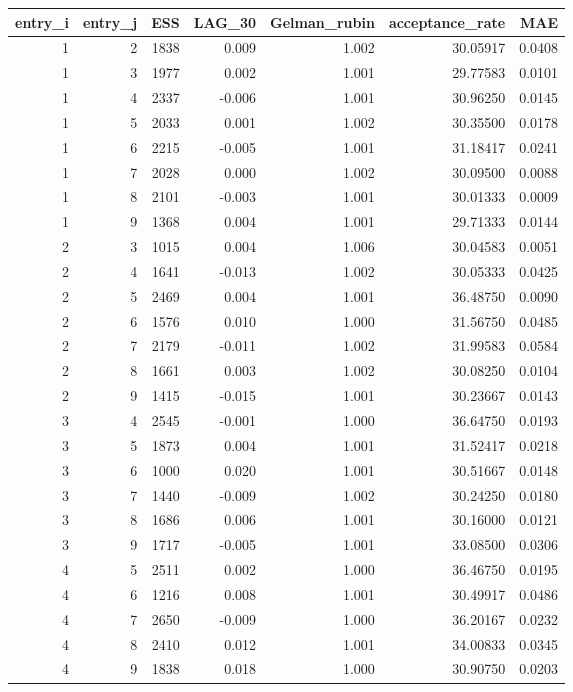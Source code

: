 \begin{longtable}{rrrrrrr}
\toprule
entry\_i & entry\_j & ESS & LAG\_30 & Gelman\_rubin & acceptance\_rate & MAE \\ 
\midrule
1 & 2 & 1838 & 0.009 & 1.002 & 30.05917 & 0.0408 \\ 
1 & 3 & 1977 & 0.002 & 1.001 & 29.77583 & 0.0101 \\ 
1 & 4 & 2337 & -0.006 & 1.001 & 30.96250 & 0.0145 \\ 
1 & 5 & 2033 & 0.001 & 1.002 & 30.35500 & 0.0178 \\ 
1 & 6 & 2215 & -0.005 & 1.001 & 31.18417 & 0.0241 \\ 
1 & 7 & 2028 & 0.000 & 1.002 & 30.09500 & 0.0088 \\ 
1 & 8 & 2101 & -0.003 & 1.001 & 30.01333 & 0.0009 \\ 
1 & 9 & 1368 & 0.004 & 1.001 & 29.71333 & 0.0144 \\ 
2 & 3 & 1015 & 0.004 & 1.006 & 30.04583 & 0.0051 \\ 
2 & 4 & 1641 & -0.013 & 1.002 & 30.05333 & 0.0425 \\ 
2 & 5 & 2469 & 0.004 & 1.001 & 36.48750 & 0.0090 \\ 
2 & 6 & 1576 & 0.010 & 1.000 & 31.56750 & 0.0485 \\ 
2 & 7 & 2179 & -0.011 & 1.002 & 31.99583 & 0.0584 \\ 
2 & 8 & 1661 & 0.003 & 1.002 & 30.08250 & 0.0104 \\ 
2 & 9 & 1415 & -0.015 & 1.001 & 30.23667 & 0.0143 \\ 
3 & 4 & 2545 & -0.001 & 1.000 & 36.64750 & 0.0193 \\ 
3 & 5 & 1873 & 0.004 & 1.001 & 31.52417 & 0.0218 \\ 
3 & 6 & 1000 & 0.020 & 1.001 & 30.51667 & 0.0148 \\ 
3 & 7 & 1440 & -0.009 & 1.002 & 30.24250 & 0.0180 \\ 
3 & 8 & 1686 & 0.006 & 1.001 & 30.16000 & 0.0121 \\ 
3 & 9 & 1717 & -0.005 & 1.001 & 33.08500 & 0.0306 \\ 
4 & 5 & 2511 & 0.002 & 1.000 & 36.46750 & 0.0195 \\ 
4 & 6 & 1216 & 0.008 & 1.001 & 30.49917 & 0.0486 \\ 
4 & 7 & 2650 & -0.009 & 1.000 & 36.20167 & 0.0232 \\ 
4 & 8 & 2410 & 0.012 & 1.001 & 34.00833 & 0.0345 \\ 
4 & 9 & 1838 & 0.018 & 1.000 & 30.90750 & 0.0203 \\ 

\end{longtable}
